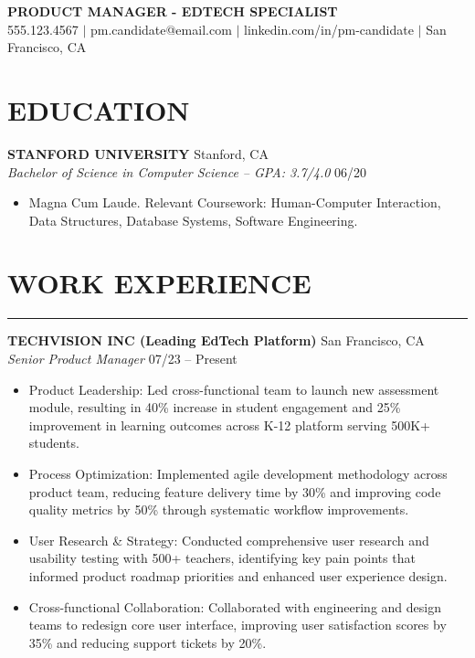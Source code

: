 \documentclass[10pt,letterpaper]{article}
\newcommand{\sectionline}{\par\vspace{-0.5em}\noindent\rule{\textwidth}{0.6pt}\vspace{0.3em}\par}
\begin{document}
\begin{center}
  {\LARGE \textbf{PRODUCT MANAGER - EDTECH SPECIALIST}}\\
  555.123.4567 $|$ pm.candidate@email.com $|$ linkedin.com/in/pm-candidate $|$ San Francisco, CA
\end{center}
\vspace{0.5em}

\section*{EDUCATION}

\noindent\textbf{STANFORD UNIVERSITY} \hfill Stanford, CA\\
\textit{Bachelor of Science in Computer Science -- GPA: 3.7/4.0} \hfill 06/20
\begin{itemize}
  \item Magna Cum Laude. Relevant Coursework: Human-Computer Interaction, Data Structures, Database Systems, Software Engineering.
\end{itemize}

\section*{WORK EXPERIENCE}
\sectionline

\noindent\textbf{TECHVISION INC (Leading EdTech Platform)} \hfill San Francisco, CA\\
\textit{Senior Product Manager} \hfill 07/23 -- Present
\begin{itemize}
  \item Product Leadership: Led cross-functional team to launch new assessment module, resulting in 40\% increase in student engagement and 25\% improvement in learning outcomes across K-12 platform serving 500K+ students.
  \item Process Optimization: Implemented agile development methodology across product team, reducing feature delivery time by 30\% and improving code quality metrics by 50\% through systematic workflow improvements.
  \item User Research \& Strategy: Conducted comprehensive user research and usability testing with 500+ teachers, identifying key pain points that informed product roadmap priorities and enhanced user experience design.
  \item Cross-functional Collaboration: Collaborated with engineering and design teams to redesign core user interface, improving user satisfaction scores by 35\% and reducing support tickets by 20\%.
\end{itemize}
\end{document}
